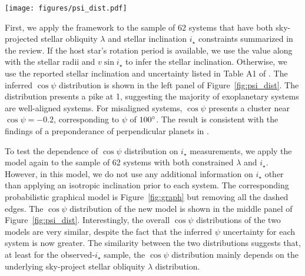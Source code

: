 \documentclass[twocolumn,times]{aastex631}
\newcommand{\numistar}{62\xspace}
\newcommand{\numall}{161\xspace}
\begin{document}
\begin{figure*}[ht!]
    \begin{centering}
        \texttt{[image: figures/psi\_dist.pdf]}
        \caption{The distributions of the cosine of 3D stellar obliquity $\cos{\psi}$. The left panel presents the inferred $\cos{\psi}$ distribution for the \numistar systems that have both sky-projected stellar obliquity $\lambda$ and stellar inclination $i_\star$ measurements using the statistical model described in Figure~\ref{fig:graph}. The middle panel uses the same sample as the left panel but now removes the likelihood function on $i_\star$. The right panel presents the $\cos{\psi}$ distribution for all \numall systems that have sky-projected stellar obliquity $\lambda$ measurements and has no likelihood function on $i_\star$. The $\cos{\psi}$ distribution for the observed-$i_\star$ are similar, and both show a cluster near $\cos{\psi} = -0.2$, whereas the distribution for all systems does not have such a trend.}
        \label{fig:psi_dist}
    \end{centering}
\end{figure*}

First, we apply the framework to the sample of \numistar systems that have both sky-projected stellar obliquity $\lambda$ and stellar inclination $i_\star$ constraints summarized in the \cite{Albrecht22} review. If the host star's rotation period is available, we use the value along with the stellar radii and $v\sin{i_\star}$ to infer the stellar inclination. Otherwise, we use the reported stellar inclination and uncertainty listed in Table A1 of \cite{Albrecht22}.
The inferred $\cos{\psi}$ distribution is shown in the left panel of Figure~\ref{fig:psi_dist}. The distribution presents a pike at 1, suggesting the majority of exoplanetary systems are well-aligned systems. For misaligned systems, $\cos{\psi}$ presents a cluster near $\cos{\psi} = -0.2$, corresponding to $\psi$ of $100\mbox{$^\circ$}$. The result is consistent with the findings of a preponderance of perpendicular planets in \cite{Albrecht21}.

To test the dependence of $\cos{\psi}$ distribution on $i_\star$ measurements, we apply the model again to the sample of \numistar systems with both constrained $\lambda$ and $i_\star$. However, in this model, we do not use any additional information on $i_\star$ other than applying an isotropic inclination prior to each system. The corresponding probabilistic graphical model is Figure~\ref{fig:graph} but removing all the dashed edges.
The $\cos{\psi}$ distribution of the new model is shown in the middle panel of Figure~\ref{fig:psi_dist}. Interestingly, the overall $\cos{\psi}$ distributions of the two models are very similar, despite the fact that the inferred $\psi$ uncertainty for each system is now greater.
The similarity between the two distributions suggests that, at least for the observed-$i_\star$ sample, the $\cos{\psi}$ distribution mainly depends on the underlying sky-project stellar obliquity $\lambda$ distribution.
\end{document}

